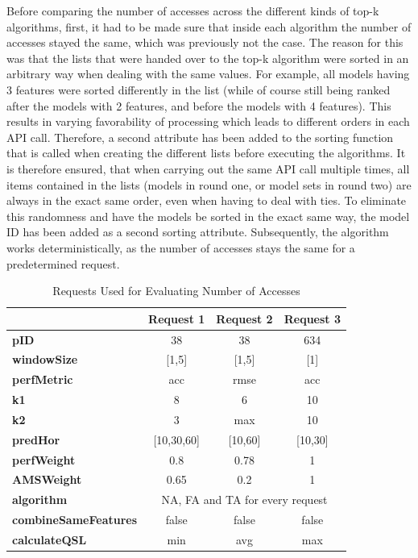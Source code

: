 Before comparing the number of accesses across the different kinds of top-k algorithms, first, it had to be made sure that inside each algorithm the number of accesses stayed the same, which was previously not the case. The reason for this was that the lists that were handed over to the top-k algorithm were sorted in an arbitrary way when dealing with the same values. For example, all models having 3 features were sorted differently in the list (while of course still being ranked after the models with 2 features, and before the models with 4 features). This results in varying favorability of processing which leads to different orders in each API call. Therefore, a second attribute has been added to the sorting function that is called when creating the different lists before executing the algorithms. It is therefore ensured, that when carrying out the same API call multiple times, all items contained in the lists (models in round one, or model sets in round two) are always in the exact same order, even when having to deal with ties. To eliminate this randomness and have the models be sorted in the exact same way, the model ID has been added as a second sorting attribute. Subsequently, the algorithm works deterministically, as the number of accesses stays the same for a predetermined request. 


\begin{table}[htbp]
\centering
    \begin{tabular}{ l | c  c  c }
        \toprule
        &
\textbf{Request 1}      
& \textbf{Request 2}   
& \textbf{Request 3} \\\midrule

\textbf{pID} & 38 & 38 & 634 \\\midrule
\textbf{windowSize} & [1,5] & [1,5] & [1] \\\midrule
\textbf{perfMetric} & acc & rmse & acc \\\midrule
\textbf{k1} & 8 & 6 &10 \\\midrule
\textbf{k2} & 3 & max & 10 \\\midrule
\textbf{predHor} & [10,30,60] & [10,60] & [10,30]\\\midrule
\textbf{perfWeight} & 0.8 & 0.78 & 1 \\\midrule
\textbf{AMSWeight} & 0.65 & 0.2 & 1\\\midrule
\textbf{algorithm}  & \multicolumn{3}{c}{NA, FA and TA for every request}  \\\midrule
\textbf{combineSameFeatures} & false & false & false \\\midrule
\textbf{calculateQSL} & min & avg & max\\
        \bottomrule
    \end{tabular}
\caption{Requests Used for Evaluating Number of Accesses} \label{accesses}
\end{table}

